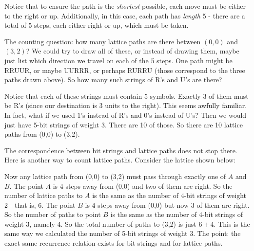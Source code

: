 \documentclass[12pt]{article}
\begin{document}
Notice that to ensure the path is the {\em shortest} possible, each move must be either to the right or up.  Additionally, in this case, each path has {\em length} 5 - there are a total of 5 steps, each either right or up, which must be taken.

The counting question: how many lattice paths are there between $(0,0)$ and $(3,2)$?  We could try to draw all of these, or instead of drawing them, maybe just list which direction we travel on each of the 5 steps.  One path might be RRUUR, or maybe UURRR, or perhaps RURRU (those correspond to the three paths drawn above).  So how many such strings of R's and U's are there?  

Notice that each of these strings must contain 5 symbols.  Exactly 3 of them must be R's (since our destination is 3 units to the right).  This seems awfully familiar.  In fact, what if we used $1$'s instead of R's and 0's instead of U's?  Then we would just have 5-bit strings of weight 3.  There are 10 of those.  So there are 10 lattice paths from (0,0) to (3,2). 

The correspondence between bit strings and lattice paths does not stop there.  Here is another way to count lattice paths.  Consider the lattice shown below:

  \begin{center}

  \end{center}

Now any lattice path from (0,0) to (3,2) must pass through exactly one of $A$ and $B$.  The point $A$ is 4 steps away from (0,0) and two of them are right.  So the number of lattice paths to $A$ is the same as the number of 4-bit strings of weight 2 - that is, 6.  The point $B$ is 4 steps away from (0,0) but now 3 of them are right.  So the number of paths to point $B$ is the same as the number of 4-bit strings of weight 3, namely 4.  So the total number of paths to (3,2) is just $6+4$.  This is the same way we calculated the number of 5-bit strings of weight 3.  The point: the exact same recurrence relation exists for bit strings and for lattice paths.
\end{document}
